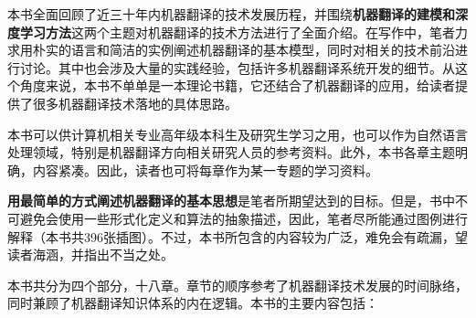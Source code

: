 \begin{spacing}{1.18}

\vspace{0.5em}

本书全面回顾了近三十年内机器翻译的技术发展历程，并围绕{\sffamily\bfseries 机器翻译的建模和深度学习方法}这两个主题对机器翻译的技术方法进行了全面介绍。在写作中，笔者力求用朴实的语言和简洁的实例阐述机器翻译的基本模型，同时对相关的技术前沿进行讨论。其中也会涉及大量的实践经验，包括许多机器翻译系统开发的细节。从这个角度来说，本书不单单是一本理论书籍，它还结合了机器翻译的应用，给读者提供了很多机器翻译技术落地的具体思路。

本书可以供计算机相关专业高年级本科生及研究生学习之用，也可以作为自然语言处理领域，特别是机器翻译方向相关研究人员的参考资料。此外，本书各章主题明确，内容紧凑。因此，读者也可将每章作为某一专题的学习资料。

{\sffamily\bfseries 用最简单的方式阐述机器翻译的基本思想}是笔者所期望达到的目标。但是，书中不可避免会使用一些形式化定义和算法的抽象描述，因此，笔者尽所能通过图例进行解释（本书共396张插图）。不过，本书所包含的内容较为广泛，难免会有疏漏，望读者海涵，并指出不当之处。

\vspace{1.0em}


\vspace{0.5em}

本书共分为四个部分，十八章。章节的顺序参考了机器翻译技术发展的时间脉络，同时兼顾了机器翻译知识体系的内在逻辑。本书的主要内容包括：


\end{spacing}
